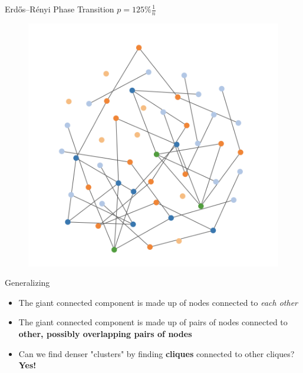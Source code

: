 \documentclass[aspectratio=169, handout]{beamer}
\begin{document}
\begin{frame}{Erdős–Rényi Phase Transition $p = 125\% \frac{1}{n}$}
\begin{figure}
\includegraphics[scale=0.22]{images/percolation-3-3.png}
\end{figure}
\end{frame}

\begin{frame}{Generalizing}
\begin{itemize}
\item The giant connected component is made up of nodes connected to \textit{each other}
\pause
\item The giant connected component is made up of pairs of nodes connected to \textbf{other, possibly overlapping pairs of nodes}
\pause
\item Can we find denser "clusters" by finding \textbf{cliques} connected to other cliques? \textbf{Yes!}
\end{itemize}
\end{frame}
\end{document}
